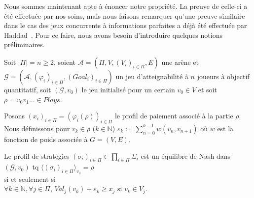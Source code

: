 Nous sommes maintenant apte à énoncer notre propriété. La preuve de celle-ci a été effectuée par nos soins, mais nous faisons remarquer qu'une preuve similaire dans le cas des jeux concurrents à informations parfaites a déjà été effectuée par Haddad~\cite{characNashEq}. Pour ce faire, nous avons besoin d'introduire quelques notions préliminaires.

\begin{propriete}
	\label{prop:rechEqpert1}
	Soit $|\Pi| = n \geq 2$,
	soient $\mathcal{A} = (\Pi, V, (V_{i})_{i\in\Pi}, E)$ une arène et $\mathcal{G} = (\mathcal{A}, (\varphi _{i})_{i\in\Pi}, (Goal_{i})_{i\in\Pi})$ un jeu d'atteignabilité à $n$ joueurs à objectif quantitatif, soit $(\mathcal{G}, v_{0})$ le jeu initialisé pour un certain $v_{0} \in V $ et soit $\rho = v_{0}v_{1}... \in Plays$. 
	
	Posons $(x_{i})_{i\in\Pi} = (\varphi _{i}(\rho))_{i\in\Pi}$ le profil de paiement associé à la partie $\rho$. Nous définissons pour $v_{k} \in \rho$ ($k \in \mathbb{N}$)  $\varepsilon _{k} := \sum _{n= 0} ^{k-1} w(v_{n},v_{n+1})$ où $w$ est la fonction de poids associée à $G = (V,E)$.
	
	\begin{center}Le profil de stratégies $ (\sigma _{i})_{i\in\Pi} \in \prod_{i\in\Pi} \Sigma _{i}$ est un équilibre de Nash dans $(\mathcal{G},v_{0})$ tq $\langle (\sigma _{i})_{i \in \Pi}\rangle_{v_0} = \rho$\\ $\text{}$\\ si et seulement si\\$\text{}$\\  $ \forall k \in \mathbb{N}, \forall j \in \Pi$, $Val_{j}(v_{k}) + \varepsilon _{k} \geq x_j \text{  si } v_{k} \in V_{j}$.\end{center}
	
\end{propriete}

\setcounter{equation}{0}

